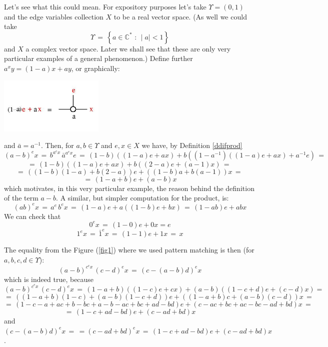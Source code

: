 Let's see what this could mean. For expository purposes let's take $\Upsilon = (0,1)$ and the edge variables collection $X$ to be a real vector space. (As well we could take 
$$\displaystyle \Upsilon \, = \,  \left\{ a \in \mathbb{C}^{*} \mbox{ : } \mid a \mid < 1 \right\}$$ and $X$ a complex vector space. Later we shall see that these are only very particular examples of a general phenomenon.) Define further $\displaystyle a^{x}y = (1-a)x + ay$, or graphically: 
\vspace{.5cm} 
\centerline{\includegraphics[width=50mm]{jpg/accept_0_1.jpg}} \vspace{.5cm}
and $\displaystyle \bar{a}=a^{-1}$. Then, for $a, b \in \Upsilon$ and $e, x \in X$ we have, by Definition \ref{ddifprod}
$$ (a-b)^{e} x \, = \,  b^{a^{e} x} \,  \bar{a}^{a^{e} x} e \, = \, (1-b) ((1-a) e + a x) + b ((1-a^{-1})((1-a)e + a x) + a^{-1}e) \, = \, $$ 
$$ = \, (1-b) ((1-a) e + a x) + b ((2-a)e + (a-1)x) \, = \, $$ $$ = \, ((1-b)(1-a) + b(2-a)) e + ((1-b)a + b(a-1))x \, = \, $$ 
$$ =\, (1-a+b)e + (a-b)x
$$ 
which motivates, in this very particular example, the reason behind the definition of the term $a-b$. A similar, but simpler computation for the product, is: 
$$(ab)^{e} x \, = \, a^{e} \, b^{e} x \, = \, (1-a) e + a((1-b)e + bx) \, = \, (1-ab)e + ab x$$
We can check that $$\displaystyle 0^{e} x \, = \, (1-0) e + 0 x = e$$  $$\displaystyle 1^{e} x \, = \, \bar{1}^{e} x \,  = \, (1-1)e + 1 x \, = \, x$$

The equality from the Figure (\ref{fig1}) where we used pattern matching is then (for $a, b, c, d \in \Upsilon$): 
$$ (a-b)^{c^{e} x} \, (c-d)^{e} x \, = \, (c-(a-b)d)^{e} x $$
which is indeed true, because
$$(a-b)^{c^{e} x} \, (c-d)^{e} x \, = \, (1-a+b) ((1-c) e + c x) + (a-b) ((1-c+d) e + (c-d)x) = \, $$ 
$$ = \, ((1-a+b)(1-c) + (a-b)(1-c+d)) e + ((1-a+b)c + (a-b)(c-d)) x \, = \,$$
$$ = \,  (1-c-a+ac+b-bc+a-b-ac+bc+ad-bd) e + (c-ac+bc+ac-bc-ad+bd)x \, = $$ 
$$ = \, (1-c+ad-bd) e + (c-ad+bd)x$$
and 
$\displaystyle (c-(a-b)d)^{e} x \, = \, = (c-ad+bd)^{e} x \, = \, (1-c+ad-bd) e + (c-ad+bd)x$. 

\vspace{.5cm}

